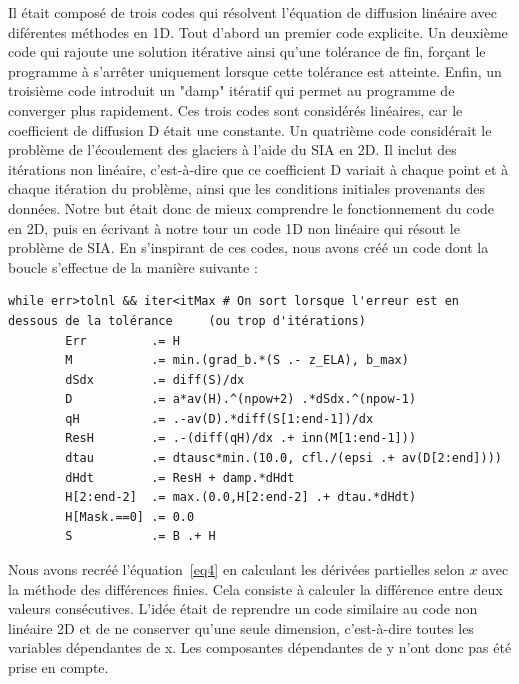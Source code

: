 \documentclass{article}
\begin{document}
 Il était composé de trois codes qui résolvent l'équation de diffusion linéaire avec diférentes méthodes en 1D. Tout d'abord un premier code explicite. Un deuxième code qui rajoute une solution itérative ainsi qu'une tolérance de fin, forçant le programme à s'arrêter uniquement lorsque cette tolérance est atteinte. Enfin, un troisième code introduit un "damp" itératif qui permet au programme de converger plus rapidement.
\newline
Ces trois codes sont considérés linéaires, car le coefficient de diffusion D était une constante.
\newline
Un quatrième code considérait le problème de l'écoulement des glaciers à l'aide du SIA en 2D. Il inclut des itérations non linéaire, c'est-à-dire que ce coefficient D variait à chaque point et à chaque itération du problème, ainsi que les conditions initiales provenants des données. Notre but était donc de mieux comprendre le fonctionnement du code en 2D, puis en écrivant à notre tour un code 1D non linéaire qui résout le problème de SIA.
\newline
En s'inspirant de ces codes, nous avons créé un code dont la boucle s'effectue de la manière suivante :
\newline
\begin{verbatim}
while err>tolnl && iter<itMax # On sort lorsque l'erreur est en 
dessous de la tolérance 	(ou trop d'itérations)
        Err         .= H                                               
        M           .= min.(grad_b.*(S .- z_ELA), b_max)            
        dSdx        .= diff(S)/dx 
        D           .= a*av(H).^(npow+2) .*dSdx.^(npow-1)              
        qH          .= .-av(D).*diff(S[1:end-1])/dx                     
        ResH        .= .-(diff(qH)/dx .+ inn(M[1:end-1])) 
        dtau        .= dtausc*min.(10.0, cfl./(epsi .+ av(D[2:end])))
        dHdt        .= ResH + damp.*dHdt                                
        H[2:end-2]  .= max.(0.0,H[2:end-2] .+ dtau.*dHdt)               
        H[Mask.==0] .= 0.0
        S           .= B .+ H                                       
\end{verbatim}
\newpage
Nous avons recréé l'équation~\eqref{eq4} en calculant les dérivées partielles selon ${x}$ avec la méthode des différences finies. Cela consiste à calculer la différence entre deux valeurs consécutives. L'idée était de reprendre un code similaire au code non linéaire 2D et de ne conserver qu'une seule dimension, c'est-à-dire toutes les variables dépendantes de x. Les composantes dépendantes de y n'ont donc pas été prise en compte.
\end{document}
